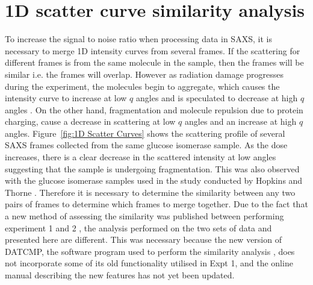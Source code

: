 \section{1D scatter curve similarity analysis}
\label{sec:1D scatter curve similarity analysis}
To increase the signal to noise ratio when processing data in SAXS, it is necessary to merge 1D intensity curves from several frames.
If the scattering for different frames is from the same molecule in the sample, then the frames will be similar i.e. the frames will overlap.
However as radiation damage progresses during the experiment, the molecules begin to aggregate, which causes the intensity curve to increase at low $q$ angles and is speculated to decrease at high $q$ angles \cite{hopkins2016quantifying}.
On the other hand, fragmentation and molecule repulsion due to protein charging, cause a decrease in scattering at low $q$ angles and an increase at high $q$ angles.
Figure~\ref{fig:1D Scatter Curves} shows the scattering profile of several SAXS frames collected from the same glucose isomerase sample.
As the dose increases, there is a clear decrease in the scattered intensity at low angles suggesting that the sample is undergoing fragmentation.
This was also observed with the glucose isomerase samples used in the study conducted by Hopkins and Thorne \cite{hopkins2016quantifying}.
Therefore it is necessary to determine the similarity between any two pairs of frames to determine which frames to merge together.
Due to the fact that a new method of assessing the similarity was published between performing experiment 1 and 2 \cite{franke2015correlation}, the analysis performed on the two sets of data and presented here are different.
This was necessary because the new version of DATCMP, the software program used to perform the similarity analysis \cite{petoukhov2012new}, does not incorporate some of its old functionality utilised in Expt 1, and the online manual describing the new features has not yet been updated.
